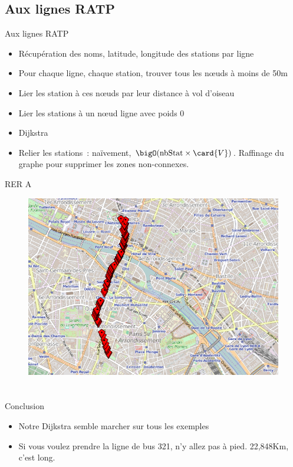 \documentclass[11pt]{beamer}
\begin{document}
\subsection{Aux lignes RATP}

\begin{frame}{Aux lignes RATP}
\begin{itemize}
\item Récupération des noms, latitude, longitude des stations par ligne
\item Pour chaque ligne, chaque station, trouver tous les nœuds à moins de 50m
\item Lier les station à ces nœuds par leur distance à vol d'oiseau
\item Lier les stations à un nœud \og ligne \fg{} avec poids 0
\item Dijkstra
\item Relier les stations~: naïvement, $\bigO(\text{nbStat} \times \card{V})$. Raffinage du graphe pour supprimer les zones non-connexes.
\end{itemize}
\end{frame}

\begin{frame}{RER A}
\begin{figure}
\includegraphics[width=0.9\linewidth]{mapToRerA.png}
\end{figure}
\end{frame}

\section*{}

\begin{frame}{Conclusion}
\begin{itemize}
\item Notre Dijkstra semble marcher sur tous les exemples
\item Si vous voulez prendre la ligne de bus 321, n'y allez pas à pied. 22,848Km, c'est long.
\end{itemize}
\end{frame}
\end{document}
